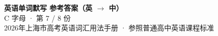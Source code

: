 \documentclass[10pt,a4paper]{article}
\begin{document}
\pagestyle{plain}

\begin{center}
{\LARGE\bfseries 英语单词默写 \quad 参考答案（英 $\to$ 中）}\\[0.22em]
{\large C 字母 · 第 7 / 8 份}\\[0.18em]
{\small 2026年上海市高考英语词汇用法手册 · 参照普通高中英语课程标准}
\end{center}

\vspace{0.2em}
\noindent{\color{rulegray}\rule{\textwidth}{0.8pt}}

\vspace{0.35em}

\vspace{0.25em}
\renewcommand{\arraystretch}{1.32}
\end{document}
